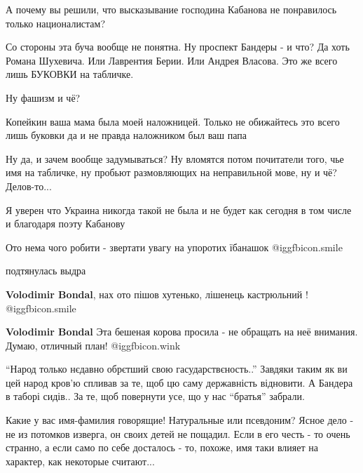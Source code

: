 \begin{itemize}
А почему вы решили, что высказывание господина Кабанова не понравилось только националистам?


\obeycr
Со стороны эта буча вообще не понятна.
Ну проспект Бандеры - и что?
Да хоть Романа Шухевича.
Или Лаврентия Берии.
Или Андрея Власова.
Это же всего лишь БУКОВКИ на табличке.
\restorecr

\begin{itemize} %
Ну фашизм и чё?

Копейкин ваша мама была моей наложницей. Только не обижайтесь это всего лишь буковки да и не правда наложником был ваш папа

Ну да, и зачем вообще задумываться?
Ну вломятся потом почитатели того, чье имя на табличке, ну пробьют размовляющих на неправильной мове, ну и чё?
Делов-то...
\end{itemize} %

Я уверен что Украина никогда такой не была и не будет как сегодня в том числе и благодаря поэту Кабанову


Ото нема чого робити - звертати увагу на упоротих їбанашок  @igg{fbicon.smile} 

\begin{itemize} %
подтянулась выдра


\textbf{Volodimir Bondal}, нах ото пішов хутенько, лішенець кастрюльний !  @igg{fbicon.smile} 

\textbf{Volodimir Bondal} Эта бешеная корова просила - не обращать на неё внимания. Думаю, отличный план!  @igg{fbicon.wink} 
\end{itemize} %


\enquote{Народ только нєдавно обрєтший свою гасударствєность..}
Завдяки таким як ви цей народ кров'ю спливав за те, щоб цю саму державність відновити.
А Бандера в таборі сидів..
За те, щоб повернути усе, що у нас \enquote{братья} забрали.

\begin{itemize} %

Какие у вас имя-фамилия говорящие! Натуральные или псевдоним? Ясное дело - не
из потомков изверга, он своих детей не пощадил. Если в его честь - то очень
странно, а если само по себе досталось - то, похоже, имя таки влияет на
характер, как некоторые считают...



\end{itemize}
\end{itemize}
